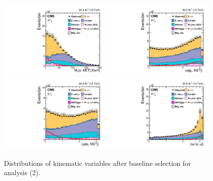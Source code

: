 \begin{figure}[!htpb]\centering
 \includegraphics[width=0.49\textwidth]{plots_and_figures/chapter5/preselection/Figure_002-e.pdf}
 \includegraphics[width=0.49\textwidth]{plots_and_figures/chapter5/preselection/Figure_002-f.pdf} \\
 \includegraphics[width=0.49\textwidth]{plots_and_figures/chapter5/preselection/Figure_002-g.pdf}
 \includegraphics[width=0.49\textwidth]{plots_and_figures/chapter5/preselection/Figure_002-h.pdf}
\caption{Distributions of kinematic variables after baseline selection for \hmue analysis (2).}
 \label{fig:h125_presel2}
\end{figure}

